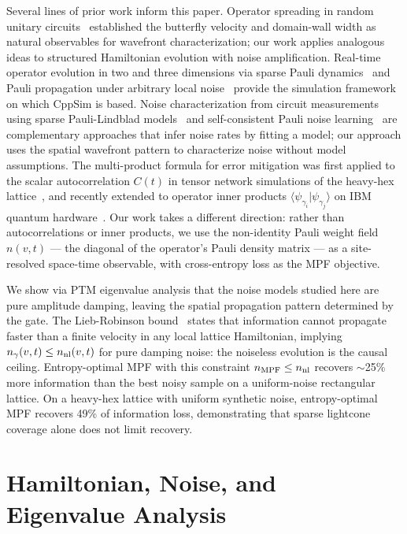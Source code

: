 \documentclass[12pt]{article}
\begin{document}
Several lines of prior work inform this paper.
Operator spreading in random unitary circuits~\cite{nahum2018operator,Tan2025Operator}
established the butterfly velocity and domain-wall width as natural observables
for wavefront characterization; our work applies analogous ideas to structured
Hamiltonian evolution with noise amplification.
Real-time operator evolution in two and three dimensions via sparse Pauli
dynamics~\cite{Begusic2025RealTime} and Pauli propagation under arbitrary local
noise~\cite{rudolph2025simulating} provide the simulation framework on which
CppSim is based.
Noise characterization from circuit measurements using sparse Pauli-Lindblad
models~\cite{Hu2025Demonstration} and self-consistent Pauli noise
learning~\cite{Chen2026Efficient} are complementary approaches that infer noise
rates by fitting a model; our approach uses the spatial wavefront pattern to
characterize noise without model assumptions.
The multi-product formula for error mitigation was first applied to the
scalar autocorrelation $C(t)$ in tensor network simulations of the heavy-hex
lattice~\cite{mpf-ref}, and recently extended to operator inner products
$\langle\psi_{\gamma_i}|\psi_{\gamma_j}\rangle$ on IBM quantum
hardware~\cite{robertson2026lindbladmultiproductformulas,dalberto2026cppsim}.
Our work takes a different direction: rather than autocorrelations or inner
products, we use the non-identity Pauli weight field $n(v,t)$ — the diagonal
of the operator's Pauli density matrix — as a site-resolved space-time
observable, with cross-entropy loss as the MPF objective.

We show via PTM eigenvalue analysis that the noise models studied here are
pure amplitude damping, leaving the spatial propagation pattern determined
by the gate.
The Lieb-Robinson bound~\cite{liebrobinson1972} states that information
cannot propagate faster than a finite velocity in any local lattice Hamiltonian,
implying $n_\gamma(v,t) \leq n_{\rm nl}(v,t)$ for pure damping noise:
the noiseless evolution is the causal ceiling.
Entropy-optimal MPF with this constraint $n_{\rm MPF} \leq n_{\rm nl}$
recovers $\sim$25\% more information than the best noisy sample on a uniform-noise
rectangular lattice.
On a heavy-hex lattice with uniform synthetic noise, entropy-optimal MPF
recovers 49\% of information loss, demonstrating that sparse lightcone
coverage alone does not limit recovery.

\section{Hamiltonian, Noise, and Eigenvalue Analysis}
\label{sec:setup}
\end{document}
